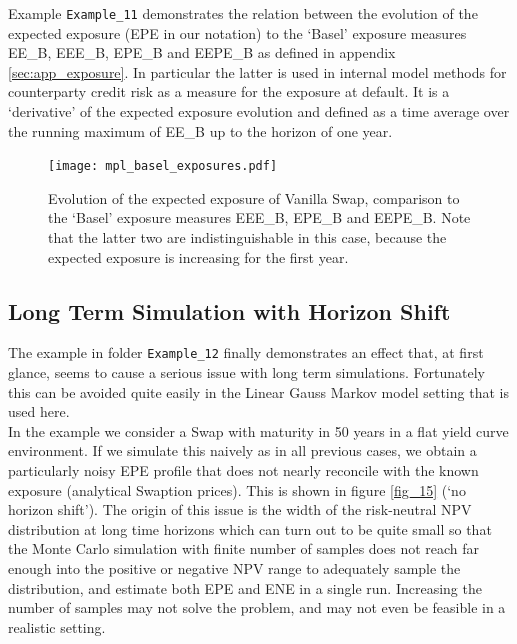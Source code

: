 \documentclass[12pt, a4paper]{article}
\begin{document}
Example {\tt Example\_11} demonstrates the relation between the evolution of the expected exposure (EPE in our notation)
to the `Basel' exposure measures EE\_B, EEE\_B, EPE\_B and EEPE\_B as defined in appendix \ref{sec:app_exposure}. In
particular the latter is used in internal model methods for counterparty credit risk as a measure for the exposure at
default. It is a `derivative' of the expected exposure evolution and defined as a time average over the running maximum
of EE\_B up to the horizon of one year.
\begin{figure}[h!]
\begin{center}
\texttt{[image: mpl\_basel\_exposures.pdf]}
\end{center}
\caption{Evolution of the expected exposure of Vanilla Swap, comparison to the `Basel' exposure measures EEE\_B, EPE\_B and EEPE\_B. Note that the latter two are indistinguishable in this case, because the expected exposure is increasing for the first year.}
\label{fig_14}
\end{figure}

\subsection{Long Term Simulation with Horizon Shift}\label{sec:longterm}

The example in folder {\tt Example\_12} finally demonstrates an effect that, at first glance, seems to cause a serious
issue with long term simulations. Fortunately this can be avoided quite easily in the Linear Gauss Markov model setting
that is used here. \\

In the example we consider a Swap with maturity in 50 years in a flat yield curve environment. If we simulate this
naively as in all previous cases, we obtain a particularly noisy EPE profile that does not nearly reconcile with the
known exposure (analytical Swaption prices). This is shown in figure \ref{fig_15} (`no horizon shift'). The origin of
this issue is the width of the risk-neutral NPV distribution at long time horizons which can turn out to be quite small
so that the Monte Carlo simulation with finite number of samples does not reach far enough into the positive or negative
NPV range to adequately sample the distribution, and estimate both EPE and ENE in a single run.  Increasing the number
of samples may not solve the problem, and may not even be feasible in a realistic setting. \\
\end{document}
